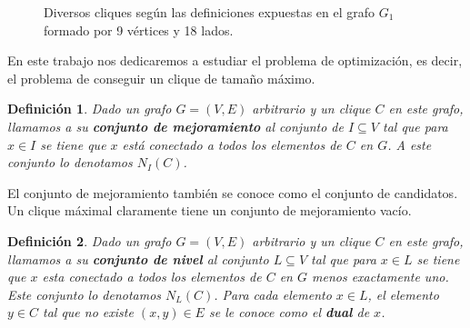 \documentclass[conference]{IEEEtran}
\newtheorem{mydef}{Definición}
\begin{document}
\begin{figure}[!t]
\centering
{}
\hfil
{}
\caption{Diversos cliques según las definiciones expuestas en el grafo
$G_1$ formado por 9 vértices y 18 lados. }
\label{fig_sim}
\end{figure}


En este trabajo nos dedicaremos a estudiar el problema de
optimización, es decir, el problema de conseguir un clique de tamaño
máximo.

\begin{mydef}
  Dado un grafo $G = (V,E)$ arbitrario y un clique $C$ en este grafo,
  llamamos a su \textbf{conjunto de mejoramiento} al conjunto de $I
  \subseteq V$ tal que para $x \in I$ se tiene que $x$ está conectado
  a todos los elementos de $C$ en $G$. A este conjunto lo denotamos
  $N_I(C)$.
\end{mydef}


El conjunto de mejoramiento también se conoce como el conjunto de
candidatos. Un clique máximal claramente tiene un conjunto de
mejoramiento vacío.

\begin{mydef}
  Dado un grafo $G = (V,E)$ arbitrario y un clique $C$ en este grafo,
  llamamos a su \textbf{conjunto de nivel} al conjunto $L \subseteq V$
  tal que para $x \in L$ se tiene que $x$ esta conectado a todos los
  elementos de $C$ en $G$ menos \emph{exactamente} uno. Este conjunto
  lo denotamos $N_L(C)$. Para cada elemento $x \in L$, el elemento $y
  \in C$ tal que no existe $(x,y) \in E$ se le conoce como el
  \textbf{dual} de $x$.
\end{mydef}
\end{document}
